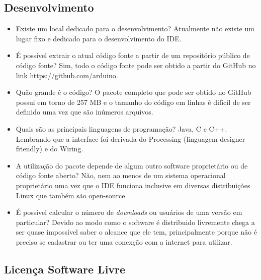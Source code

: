 \documentclass[12pt,a4paper]{article} %
\begin{document}
\subsection{Desenvolvimento}


\begin{itemize}
\item Existe um local dedicado para o desenvolvimento?
	\subitem Atualmente não existe um lugar fixo e dedicado para o desenvolvimento do IDE.
\\
\item É possível extrair o atual código fonte a partir de um repositório público de código fonte?
	\subitem Sim, todo o código fonte pode ser obtido a partir do GitHub no link https://github.com/arduino.
\\
\item Quão grande é o código?
	\subitem O pacote completo que pode ser obtido no GitHub possui em torno de 257 MB e o tamanho do código em linhas é difícil de ser definido uma vez que são inúmeros arquivos.
\\
\item Quais são as principais linguagens de programação?
	\subitem Java, C e C++. Lembrando que a interface foi derivada do Processing (linguagem designer-friendly) e do Wiring.
\\
\item A utilização do pacote depende de algum outro software proprietário ou de código fonte aberto?
	\subitem Não, nem ao menos de um sistema operacional proprietário uma vez que o IDE funciona inclusive em diversas distribuições Linux que também são open-source
\\
\item É possível calcular o número de \textit{downloads} ou usuários de uma versão em particular?
	\subitem Devido ao modo como o software é distribuido livremente chega a ser quase impossível saber o alcance que ele tem, principalmente porque não é preciso se cadastrar ou ter uma conexção com a internet para utilizar.
\\
\end{itemize}

\subsection{Licença Software Livre}
\end{document}
